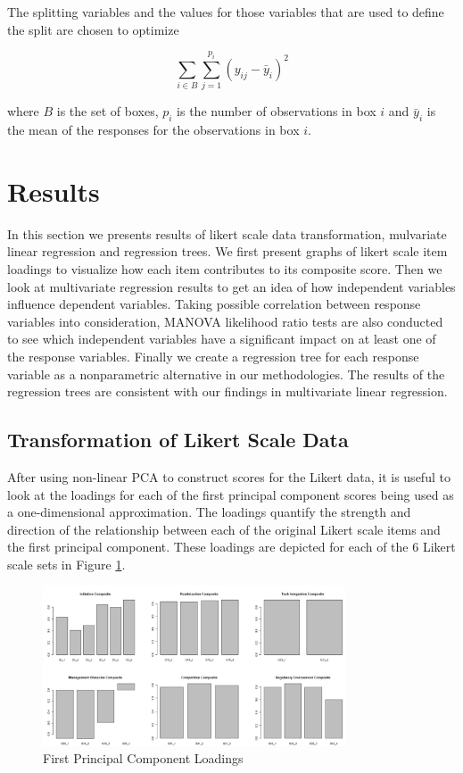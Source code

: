 \documentclass[12pt]{article}
\begin{document}
The splitting variables and the values for those variables that are used to define the split are chosen to optimize

$$
\sum_{i \in B} \sum_{j=1}^{p_i} (y_{ij}-\bar{y}_i)^2
$$

where $B$ is the set of boxes, $p_i$ is the number of observations in box $i$ and $\bar{y}_i$ is the mean of the responses for the observations in box $i$.


\section{Results}
 In this section we presents results of likert scale data transformation, mulvariate linear regression and regression trees. We first present graphs of likert scale item loadings to visualize how each item contributes to its composite score. Then we look at multivariate regression results to get an idea of how independent variables influence dependent variables. Taking possible correlation between response variables into consideration, MANOVA likelihood ratio tests are also conducted to see which independent variables have a significant impact on at least one of the response variables. Finally we create a regression tree for each response variable as a nonparametric alternative in our methodologies. The results of the regression trees are consistent with our findings in multivariate linear regression.

\subsection{Transformation of Likert Scale Data}
After using non-linear PCA to construct scores for the Likert data, it is useful to look at the loadings for each of the first principal component scores being used as a one-dimensional approximation. The loadings quantify the strength and direction of the relationship between each of the original Likert scale items and the first principal component. These loadings are depicted for each of the 6 Likert scale sets in Figure \ref{fig:loadings}.\\

\begin{figure}[H]
\centering
\includegraphics[width=0.8\textwidth]{loadings.jpg}
\caption{First Principal Component Loadings}
\label{fig:loadings}
\end{figure}
\end{document}

